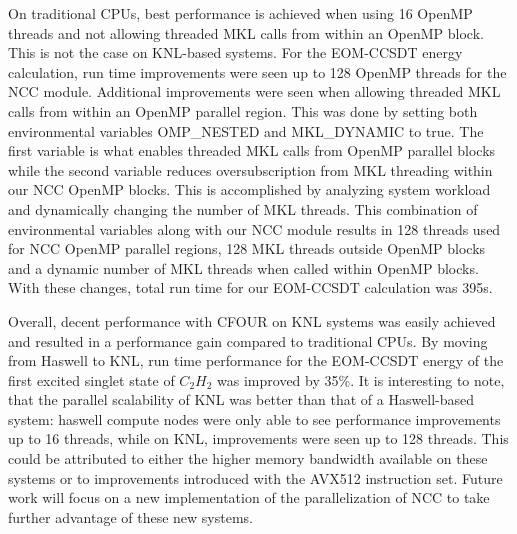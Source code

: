 On traditional CPUs, best performance is achieved when using 16 OpenMP threads and not allowing threaded MKL calls
from within an OpenMP block. This is not the case on KNL-based systems. For the EOM-CCSDT energy calculation,
run time improvements were seen up to 128 OpenMP threads for the NCC module. Additional improvements were seen
when allowing threaded MKL calls from within an OpenMP parallel region. This was done by setting both environmental
variables OMP\_NESTED and MKL\_DYNAMIC to true. The first variable is what enables threaded MKL calls from OpenMP
parallel blocks while the second variable reduces oversubscription from MKL threading within our NCC OpenMP blocks.
This is accomplished by analyzing system workload and dynamically changing the number of MKL threads. This
combination of environmental variables along with our NCC module results in 128 threads used for NCC OpenMP parallel
regions, 128 MKL threads outside OpenMP blocks and a dynamic number of MKL threads when called within OpenMP blocks.
With these changes, total run time for our EOM-CCSDT calculation was 395s.

Overall, decent performance with CFOUR on KNL systems was easily achieved and resulted in a performance
gain compared to traditional CPUs. By moving from Haswell to KNL, run time performance for the EOM-CCSDT energy
of the first excited singlet state of $C_2H_2$ was improved by 35\%. It is interesting to note, that the
parallel scalability of KNL was better than that of a Haswell-based system: haswell compute nodes were only able
to see performance improvements up to 16 threads, while on KNL, improvements were seen up to 128 threads.
This could be attributed to either the higher memory bandwidth available on these systems or to improvements
introduced with the AVX512 instruction set. Future work will focus on a new implementation of the parallelization
of NCC to take further advantage of these new systems.
